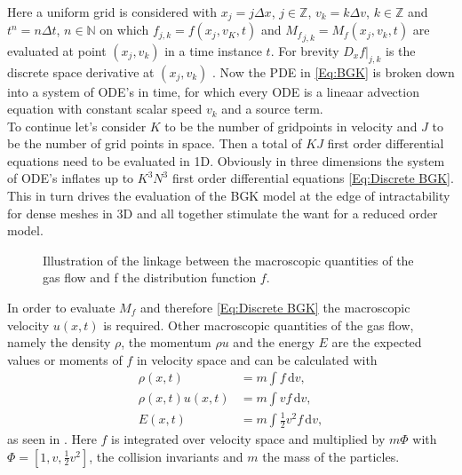 Here a uniform grid is considered with \(x_j = j\Delta x\), \(j \in \mathbb{Z}\), \(v_k = k\Delta v\), \(k \in \mathbb{Z}\) and \(t^n = n \Delta t\), \(n \in \mathbb{N}\) on which \(f_{j,k} = f(x_j,v_K,t)\) and \({M_f}_{j,k} = M_f(x_j,v_k,t)\) are evaluated at point \((x_j,v_k)\) in a time instance \(t\). For brevity \(D_x f|_{j,k}\) is the discrete space derivative at \((x_j,v_k)\) \cite{puppo2019kinetic}. Now the PDE in \cref{Eq:BGK} is broken down into a system of ODE's in time, for which every ODE is a lineaar advection equation with constant scalar speed \(v_k\) and a source term.\\ 
To continue let's consider \(K\) to be the number of gridpoints in velocity and \(J\) to be the number of grid points in space. Then a total of \(KJ\) first order differential equations need to be evaluated in 1D. Obviously in three dimensions the system of ODE's inflates up to \(K^3N^3\) first order differential equations \cref{Eq:Discrete BGK}. This in turn drives the evaluation of the BGK model at the edge of intractability for dense meshes in 3D and all together stimulate the want for a reduced order model.\\
\begin{wrapfigure}{r}{0.5\textwidth}
	\vspace{-10pt}
	\begin{center}
		\scalebox{.9}{}
	\end{center}
	\caption{Illustration of the linkage between the macroscopic quantities of the gas flow and f the distribution function \(f\).}
	\vspace{-100pt}
	\label{Fig:Demo Macro}
\end{wrapfigure}
In order to evaluate \(M_f\) and therefore \cref{Eq:Discrete BGK} the macroscopic velocity \(u(x,t)\) is required. Other macroscopic quantities of the gas flow, namely  the density \(\rho\), the momentum \(\rho u\) and the energy \(E\) are the expected values or moments of \(f\) in velocity space and can be calculated with 
\begin{align}
	\rho(x,t) &= m \int\! f \,\mathrm{d}v \mathrm{,} \label{Eq:Mom1}
	\\
	\rho(x,t) u(x,t) &= m \int\! v f \,\mathrm{d}v \mathrm{,} \label{Eq:Mom2}
	\\
	E(x,t) &= m \int\! \frac{1}{2}v^2 f  \,\mathrm{d}v \mathrm{,} \label{Eq:Mom:3}
\end{align}
as seen in  \cite{puppo2019kinetic}. Here \(f\) is integrated over velocity space and multiplied by \(m\Phi\) with \(\Phi = [1,v,\frac{1}{2} v^2]\), the collision invariants and \(m\) the mass of the particles.\\ 
